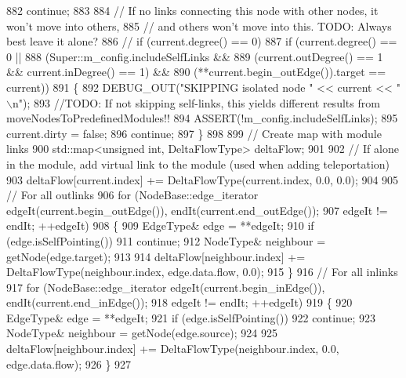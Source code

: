 \begin{DoxyCode}
{882             \textcolor{keywordflow}{continue};
883 
884         \textcolor{comment}{// If no links connecting this node with other nodes, it won't move into others,}
885         \textcolor{comment}{// and others won't move into this. TODO: Always best leave it alone?}
886 \textcolor{comment}{//      if (current.degree() == 0)}
887         \textcolor{keywordflow}{if} (current.degree() == 0 ||
888             (Super::m\_config.includeSelfLinks &&
889             (current.outDegree() == 1 && current.inDegree() == 1) &&
890             (**current.begin\_outEdge()).target == current))
891         \{
892             DEBUG\_OUT(\textcolor{stringliteral}{"SKIPPING isolated node "} << current << \textcolor{stringliteral}{"\(\backslash\)n"});
893             \textcolor{comment}{//TODO: If not skipping self-links, this yields different results from
       moveNodesToPredefinedModules!!}
894             ASSERT(!m\_config.includeSelfLinks);
895             current.dirty = \textcolor{keyword}{false};
896             \textcolor{keywordflow}{continue};
897         \}
898 
899         \textcolor{comment}{// Create map with module links}
900         std::map<unsigned int, DeltaFlowType> deltaFlow;
901 
902         \textcolor{comment}{// If alone in the module, add virtual link to the module (used when adding teleportation)}
903         deltaFlow[current.index] += DeltaFlowType(current.index, 0.0, 0.0);
904 
905         \textcolor{comment}{// For all outlinks}
906         \textcolor{keywordflow}{for} (NodeBase::edge\_iterator edgeIt(current.begin\_outEdge()), endIt(current.end\_outEdge());
907                 edgeIt != endIt; ++edgeIt)
908         \{
909             EdgeType& edge = **edgeIt;
910             \textcolor{keywordflow}{if} (edge.isSelfPointing())
911                 \textcolor{keywordflow}{continue};
912             NodeType& neighbour = getNode(edge.target);
913 
914             deltaFlow[neighbour.index] += DeltaFlowType(neighbour.index, edge.data.flow, 0.0);
915         \}
916         \textcolor{comment}{// For all inlinks}
917         \textcolor{keywordflow}{for} (NodeBase::edge\_iterator edgeIt(current.begin\_inEdge()), endIt(current.end\_inEdge());
918                 edgeIt != endIt; ++edgeIt)
919         \{
920             EdgeType& edge = **edgeIt;
921             \textcolor{keywordflow}{if} (edge.isSelfPointing())
922                 \textcolor{keywordflow}{continue};
923             NodeType& neighbour = getNode(edge.source);
924 
925             deltaFlow[neighbour.index] += DeltaFlowType(neighbour.index, 0.0, edge.data.flow);
926         \}
927 
}
\end{DoxyCode}
